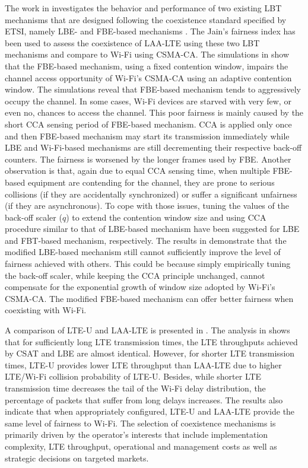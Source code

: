 The work in \cite{Enhanced-LTE-U-thesis-2015} investigates the behavior and performance of two existing LBT mechanisms that are designed following the coexistence standard specified by ETSI, namely LBE- and FBE-based mechanisms \cite{LBT-ETSI-2014}. The Jain's fairness index has been used to assess the coexistence of \mbox{LAA-LTE} using these two LBT mechanisms and compare to \mbox{Wi-Fi} using CSMA-CA. The simulations in \cite{Enhanced-LTE-U-thesis-2015} show that the FBE-based mechanism, using a fixed contention window, impairs the channel access opportunity of \mbox{Wi-Fi}'s CSMA-CA using an adaptive contention window. The simulations reveal that FBE-based mechanism tends to aggressively occupy the channel. In some cases, \mbox{Wi-Fi} devices are starved with very few, or even no, chances to access the channel. This poor fairness is mainly caused by the short CCA sensing period of FBE-based mechanism. CCA is applied only once and then FBE-based mechanism may start its transmission immediately while LBE and \mbox{Wi-Fi}-based mechanisms are still decrementing their respective back-off counters. The fairness is worsened by the longer frames used by FBE. Another observation is that, again due to equal CCA sensing time, when multiple FBE-based equipment are contending for the channel, they are prone to serious collisions (if they are accidentally synchronized) or suffer a significant unfairness (if they are asynchronous). To cope with those issues, tuning the values of the back-off scaler ($q$) to extend the contention window size and using CCA procedure similar to that of LBE-based mechanism have been suggested for LBE and FBT-based mechanism, respectively. The results in \cite{Enhanced-LTE-U-thesis-2015} demonstrate that the modified LBE-based mechanism still cannot sufficiently improve the level of fairness achieved with others. This could be because simply empirically tuning the back-off scaler, while keeping the CCA principle unchanged, cannot compensate for the exponential growth of window size adopted by \mbox{Wi-Fi}'s CSMA-CA. The modified FBE-based mechanism can offer better fairness when coexisting with \mbox{Wi-Fi}.

A comparison of \mbox{LTE-U} and \mbox{LAA-LTE} is presented in \cite{LBT-CSAT-2015}. The analysis in \cite{LBT-CSAT-2015} shows that for sufficiently long LTE transmission times, the LTE throughputs achieved by CSAT and LBE are almost identical. However, for shorter LTE transmission times, \mbox{LTE-U} provides lower LTE throughput than \mbox{LAA-LTE} due to higher LTE/\mbox{Wi-Fi} collision probability of \mbox{LTE-U}. Besides, while shorter LTE transmission time decreases the tail of the \mbox{Wi-Fi} delay distribution, the percentage of packets that suffer from long delays increases. The results also indicate that when appropriately configured, \mbox{LTE-U} and \mbox{LAA-LTE} provide the same level of fairness to \mbox{Wi-Fi}. The selection of coexistence mechanisms is primarily driven by the operator's interests that include implementation complexity, LTE throughput, operational and management costs as well as strategic decisions on targeted markets.

